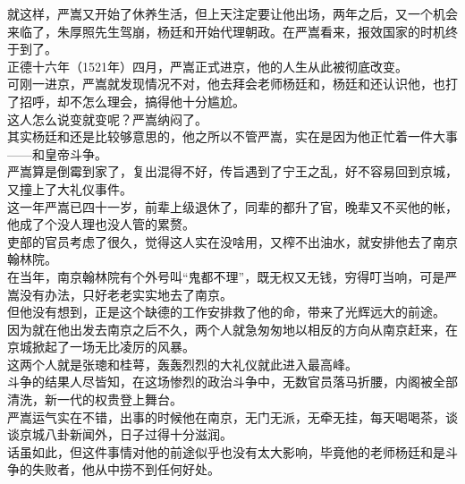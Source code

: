 \begin{multicols}{\theparacolNo}
就这样，严嵩又开始了休养生活，但上天注定要让他出场，两年之后，又一个机会来临了，朱厚照先生驾崩，杨廷和开始代理朝政。在严嵩看来，报效国家的时机终于到了。\\

正德十六年（1521年）四月，严嵩正式进京，他的人生从此被彻底改变。\\

可刚一进京，严嵩就发现情况不对，他去拜会老师杨廷和，杨廷和还认识他，也打了招呼，却不怎么理会，搞得他十分尴尬。\\

这人怎么说变就变呢？严嵩纳闷了。\\

其实杨廷和还是比较够意思的，他之所以不管严嵩，实在是因为他正忙着一件大事——和皇帝斗争。\\

严嵩算是倒霉到家了，复出混得不好，传旨遇到了宁王之乱，好不容易回到京城，又撞上了大礼仪事件。\\

这一年严嵩已四十一岁，前辈上级退休了，同辈的都升了官，晚辈又不买他的帐，他成了个没人理也没人管的累赘。\\

吏部的官员考虑了很久，觉得这人实在没啥用，又榨不出油水，就安排他去了南京翰林院。\\

在当年，南京翰林院有个外号叫“鬼都不理”，既无权又无钱，穷得叮当响，可是严嵩没有办法，只好老老实实地去了南京。\\

但他没有想到，正是这个缺德的工作安排救了他的命，带来了光辉远大的前途。\\

因为就在他出发去南京之后不久，两个人就急匆匆地以相反的方向从南京赶来，在京城掀起了一场无比凌厉的风暴。\\

这两个人就是张璁和桂萼，轰轰烈烈的大礼仪就此进入最高峰。\\

斗争的结果人尽皆知，在这场惨烈的政治斗争中，无数官员落马折腰，内阁被全部清洗，新一代的权贵登上舞台。\\

严嵩运气实在不错，出事的时候他在南京，无门无派，无牵无挂，每天喝喝茶，谈谈京城八卦新闻外，日子过得十分滋润。\\

话虽如此，但这件事情对他的前途似乎也没有太大影响，毕竟他的老师杨廷和是斗争的失败者，他从中捞不到任何好处。\\


\end{multicols}
